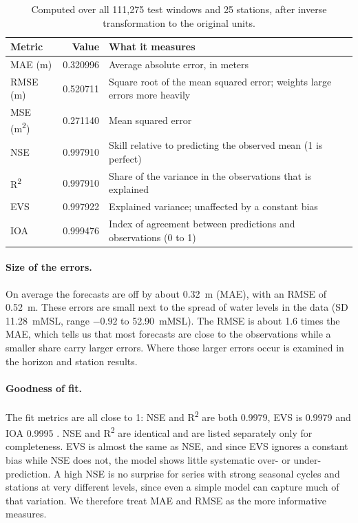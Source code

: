 \begin{table}[htbp]
  \centering
  \caption{Overall Test-Set Performance of CFL-EDLSTM}
  \label{tab:4.cfl-overall}
  \small
  \renewcommand{\arraystretch}{1.15}
  \begin{tabular}{@{}l r p{7.2cm}@{}}
    \toprule
    \textbf{Metric} & \textbf{Value} & \textbf{What it measures} \\
    \midrule
    MAE (m) & 0.320996 & Average absolute error, in meters \\
    RMSE (m) & 0.520711 & Square root of the mean squared error; weights large errors more heavily \\
    MSE (m\textsuperscript{2}) & 0.271140 & Mean squared error \\
    NSE & 0.997910 & Skill relative to predicting the observed mean (1 is perfect) \\
    R\textsuperscript{2} & 0.997910 & Share of the variance in the observations that is explained \\
    EVS & 0.997922 & Explained variance; unaffected by a constant bias \\
    IOA & 0.999476 & Index of agreement between predictions and observations (0 to 1) \\
    \bottomrule
  \end{tabular}
  \caption*{\footnotesize Computed over all 111{,}275 test windows and 25 stations, after inverse transformation to the original units.}
\end{table}

\paragraph{Size of the errors.}
On average the forecasts are off by about 0.32~m (MAE), with an RMSE of 0.52~m.
These errors are small next to the spread of water levels in the data (SD
11.28~mMSL, range $-0.92$ to 52.90~mMSL). The RMSE is about 1.6 times the MAE,
which tells us that most forecasts are close to the observations while a smaller
share carry larger errors. Where those larger errors occur is examined in the
horizon and station results.

\paragraph{Goodness of fit.}
The fit metrics are all close to 1: NSE and R\textsuperscript{2} are both
0.9979, EVS is 0.9979 and IOA 0.9995 \cite{NashSutcliffe1970}. NSE and
R\textsuperscript{2} are identical and are listed separately only for
completeness. EVS is almost the same as NSE, and since EVS ignores a constant
bias while NSE does not, the model shows little systematic over- or
under-prediction. A high NSE is no surprise for series with strong seasonal
cycles and stations at very different levels, since even a simple model can
capture much of that variation. We therefore treat MAE and RMSE as the more
informative measures.

